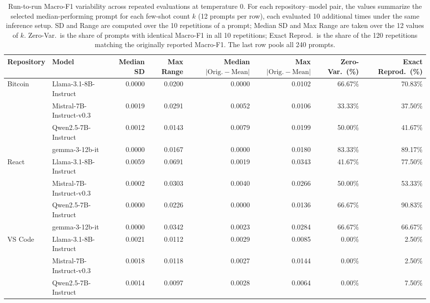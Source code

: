 \begin{table}[t!]
    \centering
    \fontsize{8}{9}\selectfont
    \tabcolsep=0.1cm
    \caption{Run-to-run Macro-F1 variability across repeated evaluations at temperature $0$.
    For each repository--model pair, the values summarize the selected median-performing
    prompt for each few-shot count $k$ (12 prompts per row), each evaluated 10 additional
    times under the same inference setup. SD and Range are computed over the 10 repetitions
    of a prompt; Median SD and Max Range are taken over the 12 values of $k$.
    Zero-Var.\ is the share of prompts with identical Macro-F1 in all 10 repetitions;
    Exact Reprod.\ is the share of the 120 repetitions matching the originally reported Macro-F1.
    The last row pools all 240 prompts.}
    \label{tab:inference-variability}
    \begin{tabular}{llrrrrrr}
        \toprule
        \textbf{Repository} &
        \textbf{Model} &
        \textbf{Median SD} &
        \textbf{Max Range} &
        \textbf{Median $|\mathrm{Orig.}-\mathrm{Mean}|$} &
        \textbf{Max $|\mathrm{Orig.}-\mathrm{Mean}|$} &
        \textbf{Zero-Var.\ (\%)} &
        \textbf{Exact Reprod.\ (\%)} \\
        \midrule
\multirow{4}{*}{Bitcoin} & Llama-3.1-8B-Instruct & 0.0000 & 0.0200 & 0.0000 & 0.0102 & 66.67\% & 70.83\% \\
 & Mistral-7B-Instruct-v0.3 & 0.0019 & 0.0291 & 0.0052 & 0.0106 & 33.33\% & 37.50\% \\
 & Qwen2.5-7B-Instruct & 0.0012 & 0.0143 & 0.0079 & 0.0199 & 50.00\% & 41.67\% \\
 & gemma-3-12b-it & 0.0000 & 0.0167 & 0.0000 & 0.0180 & 83.33\% & 89.17\% \\
\midrule
\multirow{4}{*}{React} & Llama-3.1-8B-Instruct & 0.0059 & 0.0691 & 0.0019 & 0.0343 & 41.67\% & 77.50\% \\
 & Mistral-7B-Instruct-v0.3 & 0.0002 & 0.0303 & 0.0040 & 0.0266 & 50.00\% & 53.33\% \\
 & Qwen2.5-7B-Instruct & 0.0000 & 0.0226 & 0.0000 & 0.0136 & 66.67\% & 90.83\% \\
 & gemma-3-12b-it & 0.0000 & 0.0342 & 0.0023 & 0.0284 & 66.67\% & 66.67\% \\
\midrule
\multirow{4}{*}{VS Code} & Llama-3.1-8B-Instruct & 0.0021 & 0.0112 & 0.0029 & 0.0085 & 0.00\% & 2.50\% \\
 & Mistral-7B-Instruct-v0.3 & 0.0018 & 0.0118 & 0.0027 & 0.0144 & 0.00\% & 2.50\% \\
 & Qwen2.5-7B-Instruct & 0.0014 & 0.0097 & 0.0028 & 0.0064 & 0.00\% & 7.50\% \\

\end{tabular}
\end{table}
